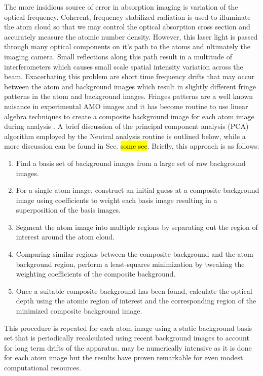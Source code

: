 The more insidious source of error in absorption imaging is variation of the optical frequency. Coherent, frequency stabilized radiation is used to illuminate the atom cloud so that we may control the optical absorption cross section and accurately measure the atomic number density. However, this laser light is passed through many optical components on it's path to the atoms and ultimately the imaging camera. Small reflections along this path result in a multitude of interferometers which causes small scale spatial intensity variation across the beam. Exacerbating this problem are short time frequency drifts that may occur between the atom and background images which result in slightly different fringe patterns in the atom and background images. Fringes patterns are a well known nuisance in experimental AMO images and it has become routine to use linear algebra techniques to create a composite background image for each atom image during analysis \cite{Segal2009}. A brief discussion of the principal component analysis (PCA) algorithm employed by the Neutral analysis routine is outlined below, while a more discussion can be found in Sec. \hl{some sec}. Briefly, this approach is as follows:
\begin{enumerate}
\item Find a basis set of background images from a large set of raw background images.
\item For a single atom image, construct an initial guess at a composite background image using coefficients to weight each basis image resulting in a superposition of the basis images.
\item Segment the atom image into multiple regions by separating out the region of interest around the atom cloud.
\item Comparing similar regions between the composite background and the atom background region, perform a least-squares minimization by tweaking the weighting coefficients of the composite background.
\item Once a suitable composite background has been found, calculate the optical depth using the atomic region of interest and the corresponding region of the minimized composite background image.
\end{enumerate}
This procedure is repeated for each atom image using a static background basis set that is periodically recalculated using recent background images to account for long term drifts of the apparatus. may be numerically intensive as it is done for each atom image but the results have proven remarkable for even modest computational resources. 

